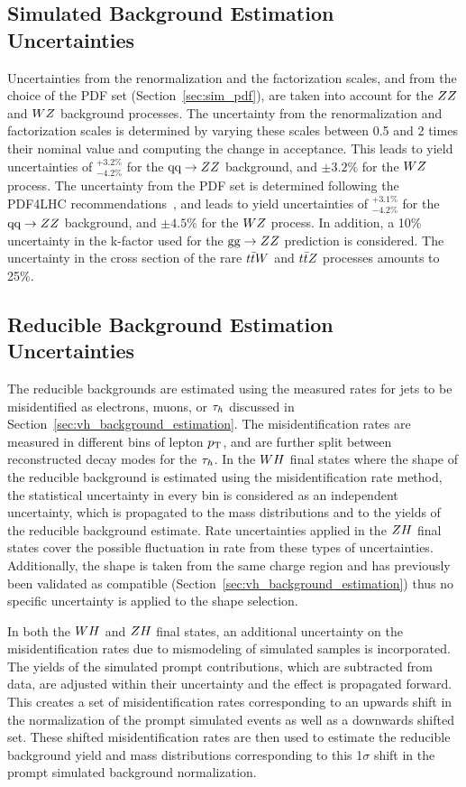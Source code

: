 \subsection{Simulated Background Estimation Uncertainties}
Uncertainties from the renormalization and the factorization scales, and from the 
choice of the PDF set (Section~\ref{sec:sim_pdf}), are taken into account for the $ZZ$ and $WZ$ 
background processes. The uncertainty from the renormalization and factorization 
scales is determined by varying these scales between 0.5 and 2 times their nominal 
value and computing the change in acceptance. This leads to yield uncertainties 
of $^{+3.2\%}_{-4.2\%}$ for the $\text{q}\text{q}\rightarrow ZZ$ background, and $\pm 3.2\%$ 
for the $WZ$ process. The uncertainty from the PDF set is determined following 
the PDF4LHC recommendations~\cite{Butterworth:2015oua}, and leads to yield uncertainties of $^{+3.1\%}_{-4.2\%}$ for 
the $\text{q}\text{q}\rightarrow ZZ$ background, and $\pm 4.5\%$ for the $WZ$ process. 
In addition, a 10\% uncertainty in the k-factor used for the $\text{g}\text{g} \rightarrow 
ZZ$ prediction is considered. The uncertainty in the cross section of the 
rare $t\bar{t}W$ and $t\bar{t}Z$ processes amounts to 25\%.

\subsection{Reducible Background Estimation Uncertainties}
The reducible backgrounds are estimated using the measured rates for jets to be 
misidentified as electrons, muons, or $\tau_{h}$ discussed in 
Section~\ref{sec:vh_background_estimation}. The misidentification rates are 
measured in different bins of lepton $p_\mathrm{T}$, and are further split between 
reconstructed decay modes for the $\tau_{h}$. In the $WH$ final states where
the shape of the reducible background is estimated using the misidentification rate
method, the statistical uncertainty in every 
bin is considered as an independent uncertainty, which is propagated to the mass 
distributions and to the yields of the reducible background estimate. Rate
uncertainties applied in the $ZH$ final states cover the possible fluctuation
in rate from these types of uncertainties. Additionally, the shape is taken from the same charge
region and has previously been validated as compatible (Section~\ref{sec:vh_background_estimation}) 
thus no specific uncertainty is applied to the shape selection.

In both the $WH$ and $ZH$ final states, an additional
uncertainty on the misidentification rates due to mismodeling of simulated
samples is incorporated. The yields of the simulated prompt contributions, which are subtracted from
data, are adjusted within their uncertainty and the effect is propagated forward. This
creates a set of misidentification rates corresponding to an upwards shift in the
normalization of the prompt simulated events as well as a downwards shifted set. These
shifted misidentification rates are then used to estimate the reducible background yield and 
mass distributions corresponding to this 1$\sigma$ shift in the prompt simulated 
background normalization.

